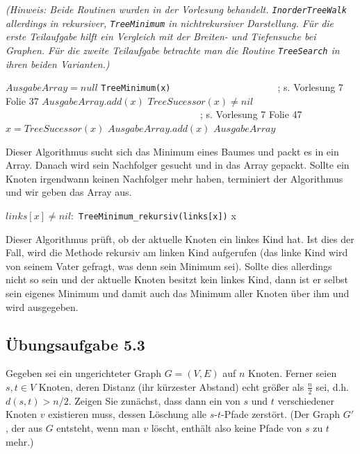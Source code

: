 \documentclass{article}
\begin{document}
\textit{
	(Hinweis: Beide Routinen wurden in der Vorlesung behandelt.
	\texttt{InorderTreeWalk} allerdings in rekursiver, \texttt{TreeMinimum} in nichtrekursiver Darstellung.
	Für die erste Teilaufgabe hilft ein Vergleich mit der Breiten- und Tiefensuche bei Graphen.
	Für die zweite Teilaufgabe betrachte man die Routine \texttt{TreeSearch} in ihren beiden Varianten.)
}
\vspace{1cm}\-\\
\begin{codebox}
	\li $AusgabeArray = null$
	\li \texttt{TreeMinimum(x)}~~~~~~~~~~~~~~~~~~~~~~; s. Vorlesung 7 Folie 37
	\li $AusgabeArray.add(x)$
	\li \While $TreeSucessor(x) \neq nil$ \Do ~~~~~~~~~~~~~~~~~~~~~~~~~~~~~~~~~~~~~~~~; s. Vorlesung 7 Folie 47
		\li $x = TreeSucessor(x)$
		\li $AusgabeArray.add(x)$
	\li \Return $AusgabeArray$
\end{codebox}
Dieser Algorithmus sucht sich das Minimum eines Baumes und packt es in ein Array.
Danach wird sein Nachfolger gesucht und in das Array gepackt.
Sollte ein Knoten irgendwann keinen Nachfolger mehr haben, terminiert der Algorithmus und wir geben das Array aus.
\vspace{1cm}
\begin{codebox}
	\li \If $links[x] \neq nil:$
		\li \texttt{TreeMinimum\_rekursiv(links[x])}
	\li \Else \Return x
\end{codebox}

Dieser Algorithmus prüft, ob der aktuelle Knoten ein linkes Kind hat.
Ist dies der Fall, wird die Methode rekursiv am linken Kind aufgerufen (das linke Kind wird von seinem Vater gefragt, was denn sein Minimum sei).
Sollte dies allerdings nicht so sein und der aktuelle Knoten besitzt kein linkes Kind, dann ist er selbst sein eigenes Minimum und damit auch das Minimum aller Knoten über ihm und wird ausgegeben.


\subsection*{Übungsaufgabe 5.3}
\label{ssec:5.3}
\begin{flushright}
\begin{Large}
[~~~~\string| ~~4~]
\end{Large}
\end{flushright}
Gegeben sei ein ungerichteter Graph $G = (V, E)$ auf $n$ Knoten.
Ferner seien $s, t \in V$ Knoten, deren Distanz (ihr kürzester Abstand) echt größer als $\frac{n}{2}$ sei, d.h. $d(s, t) > n/2$.
Zeigen Sie zunächst, dass dann ein von $s$ und $t$ verschiedener Knoten $v$ existieren muss, dessen Löschung alle $s$-$t$-Pfade zerstört.
(Der Graph $G'$, der aus $G$ entsteht, wenn man $v$ löscht, enthält also keine Pfade von $s$ zu $t$ mehr.)
\end{document}
